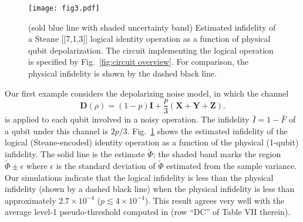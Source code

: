 \documentclass[twocolumn,pra]{revtex4}
\begin{document}
\begin{figure}
\centering
\texttt{[image: fig3.pdf]}
\caption{(sold blue line with shaded uncertainty band) Estimated infidelity of a  Steane [[7,1,3]] logical identity operation as a function of physical qubit depolarization.  The circuit implementing the logical operation is specified by Fig.~\ref{fig:circuit overview}. For comparison, the physical infidelity is shown by the dashed black line.}
\label{fig:dpler}
\end{figure}
\par
Our first example considers the depolarizing noise model, in which the channel
\begin{equation}
\mathbf{D}(\rho) = (1-p) \mathbf{I} + \frac{p}{3}\left(\mathbf{X} + \mathbf{Y} + \mathbf{Z}\right).
\end{equation}
is applied to each qubit involved in a noisy operation. The infidelity $\bar{I}= 1-\bar{F}$ of a qubit under this channel is $2p/3$. Fig.~\ref{fig:dpler} shows the estimated infidelity of the logical (Steane-encoded) identity operation as a function of the physical (1-qubit) infidelity. The solid line is the estimate $\tilde{\Phi}$; the shaded band marks the region $\tilde{\Phi} \pm \epsilon$ where $\epsilon$ is the standard deviation of $\tilde{\Phi}$ estimated from the sample variance. Our simulations indicate that the logical infidelity is less than the physical infidelity (shown by a dashed black line) when the physical infidelity is less than approximately $2.7\times 10^{-4}$ ($p\lesssim 4\times 10^{-4}$). This result agrees very well with the average level-1 pseudo-threshold computed in \cite{Gutierrez2015} (row ``DC'' of Table VII therein).
\par
\end{document}
